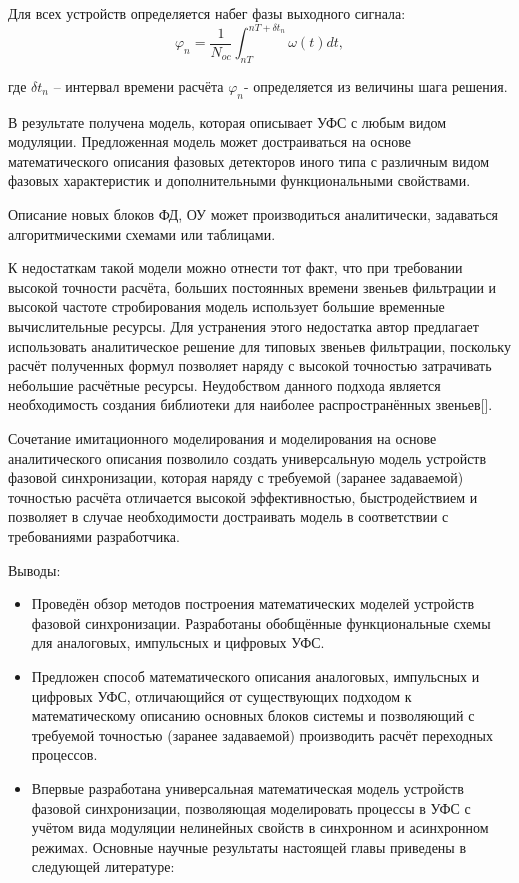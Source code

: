 Для всех устройств определяется набег фазы выходного сигнала:
\begin{equation}
\label{eq:equation2_29}
 \varphi_n=\frac{1}{N_{oc}}\int^{nT+\delta t_n}_{nT}\omega(t)dt,
\end{equation}\par
\noindent где $\delta t_n$ – интервал времени расчёта $ \varphi_n$- определяется из величины шага решения. \par
В результате получена модель, которая описывает УФС с любым видом модуляции. Предложенная модель может достраиваться на основе математического описания фазовых детекторов иного типа с различным видом фазовых характеристик и дополнительными функциональными свойствами. \par
Описание новых блоков ФД, ОУ может производиться аналитически, задаваться алгоритмическими схемами или таблицами.\par
К недостаткам такой модели можно отнести тот факт, что при требовании высокой точности расчёта, больших постоянных времени звеньев фильтрации и высокой частоте стробирования модель использует большие временные вычислительные ресурсы. Для устранения этого недостатка автор предлагает использовать аналитическое решение для типовых звеньев фильтрации, поскольку расчёт полученных формул позволяет наряду с высокой точностью затрачивать небольшие расчётные ресурсы. Неудобством данного подхода является необходимость создания библиотеки для наиболее распространённых звеньев[].\par
Сочетание имитационного моделирования и моделирования на основе аналитического описания позволило создать универсальную модель устройств фазовой синхронизации, которая наряду с требуемой (заранее задаваемой) точностью расчёта отличается высокой эффективностью, быстродействием и позволяет в случае необходимости достраивать модель в соответствии с требованиями разработчика.\par
Выводы:
\begin{itemize}
\item  Проведён обзор методов построения математических моделей устройств фазовой синхронизации. Разработаны обобщённые функциональные схемы для аналоговых, импульсных и цифровых УФС.
 \item Предложен способ математического описания аналоговых, импульсных и цифровых УФС, отличающийся от существующих подходом к математическому описанию основных блоков системы и позволяющий с требуемой точностью (заранее задаваемой) производить расчёт переходных процессов.
 \item Впервые разработана универсальная математическая модель устройств фазовой синхронизации, позволяющая моделировать процессы в УФС с учётом вида модуляции нелинейных свойств в синхронном и асинхронном режимах.
Основные научные результаты настоящей главы приведены в следующей литературе:
\end{itemize}
